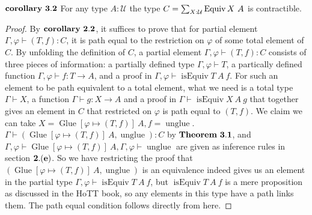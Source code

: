 \documentclass[11pt]{article}
\DeclareMathOperator{\Equiv}{Equiv}
\DeclareMathOperator{\isEquiv}{isEquiv}
\DeclareMathOperator{\unglue}{unglue}
\DeclareMathOperator{\Glue}{Glue}
\begin{document}
$\bf corollary \ 3.2$ For any type $A :\mathcal U$ the type $C = \sum_{X : {\cal U}}  \Equiv X \ A$ is contractible.
\begin{proof}
	By $\bf corollary \ 2.2$, it suffices to prove that for partial element $\Gamma, \varphi\vdash (T,f):C$, it is path equal to the restriction on $\varphi$ of some total element of $C$. By unfolding the definition of $C$, a partial element $\Gamma, \varphi\vdash (T,f):C$ consists of three pieces of information: a partially defined type $\Gamma, \varphi\vdash T$, a partically defined function $\Gamma, \varphi\vdash f:T\to A$, and a proof in $\Gamma,\varphi\vdash \isEquiv T \ A \ f$. For such an element to be path equivalent to a total element, what we need is a total type $\Gamma\vdash X$, a function $\Gamma\vdash g:X\to A$ and a proof in $\Gamma\vdash \isEquiv X \ A \ g$ that together gives an element in $C$ that restricted on $\varphi$ is path equal to $(T,f)$. We claim we can take $X=\Glue [\varphi\mapsto (T,f)] \ A,f = \unglue$. $\Gamma\vdash(\Glue [\varphi\mapsto (T,f)] \ A,\unglue):C$ by $\bf Theorem \ 3.1$, and $\Gamma, \varphi\vdash \Glue [\varphi\mapsto (T,f)] \ A,\Gamma, \varphi\vdash \unglue$ are given as inference rules in section $\bf 2.(e)$. So we have restricting the proof that $(\Glue [\varphi\mapsto (T,f)] \ A,\unglue)$ is an equivalence indeed gives us an element in the partial type $\Gamma,\varphi\vdash \isEquiv T \ A \ f$, but $\isEquiv T \ A \ f$ is a mere proposition as discussed in the HoTT book, so any elements in this type have a path links them. The path equal condition follows directly from here.
\end{proof}
\end{document}
